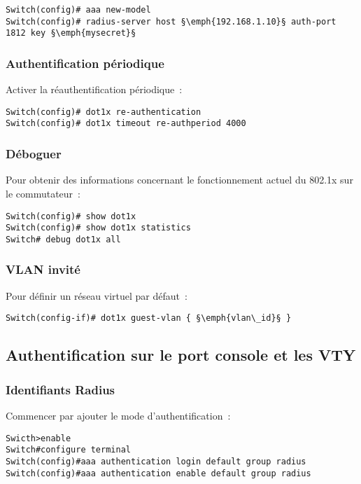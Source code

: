\begin{lstlisting}
Switch(config)# aaa new-model
Switch(config)# radius-server host §\emph{192.168.1.10}§ auth-port 1812 key §\emph{mysecret}§
\end{lstlisting}

\subsubsection{Authentification périodique}

Activer la réauthentification périodique~:

\begin{lstlisting}
Switch(config)# dot1x re-authentication
Switch(config)# dot1x timeout re-authperiod 4000
\end{lstlisting}

\subsubsection{Déboguer}

Pour obtenir des informations concernant le fonctionnement actuel du 802.1x sur le commutateur~:

\begin{lstlisting}
Switch(config)# show dot1x
Switch(config)# show dot1x statistics
Switch# debug dot1x all
\end{lstlisting}

\subsubsection{VLAN invité}

Pour définir un réseau virtuel par défaut~:

\begin{lstlisting}
Switch(config-if)# dot1x guest-vlan { §\emph{vlan\_id}§ }
\end{lstlisting}

\subsection{Authentification sur le port console et les VTY}
\subsubsection{Identifiants Radius}

Commencer par ajouter le mode d'authentification~:

\begin{lstlisting}
Swicth>enable
Switch#configure terminal
Switch(config)#aaa authentication login default group radius
Switch(config)#aaa authentication enable default group radius
\end{lstlisting}

